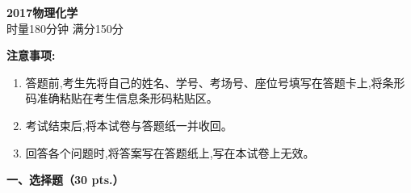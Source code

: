 \begin{center}
    {\LARGE \textbf{2017物理化学}} \\[2ex]
    {\large 时量180分钟 \quad 满分150分}
\end{center}

\vspace{0.5cm}
\noindent\textbf{注意事项:}
\begin{enumerate}[label=\arabic*., parsep=0pt, itemsep=0pt]
    \item 答题前,考生先将自己的姓名、学号、考场号、座位号填写在答题卡上,将条形码准确粘贴在考生信息条形码粘贴区。
    \item 考试结束后,将本试卷与答题纸一并收回。
    \item 回答各个问题时,将答案写在答题纸上,写在本试卷上无效。
\end{enumerate}

\vspace{0.5cm}
\noindent\textbf{一、选择题（30 pts.）}


